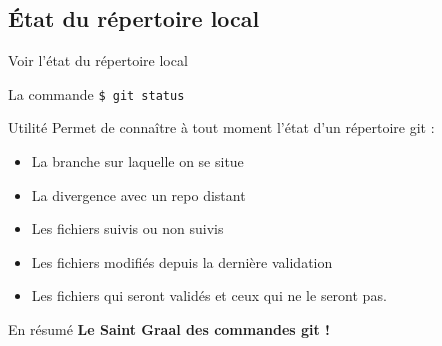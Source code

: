 \documentclass[usepdftitle=false]{beamer}
\begin{document}
\subsection{\'Etat du répertoire local}

\begin{frame}[fragile]{Voir l'état du répertoire local}
	\begin{block}{La commande}
		\verb+$ git status+
	\end{block}
	\begin{block}{Utilité}
		Permet de connaître à tout moment l'état d'un répertoire git :
		\begin{itemize}
			\item La branche sur laquelle on se situe
			\item La divergence avec un repo distant
			\item Les fichiers suivis ou non suivis
			\item Les fichiers modifiés depuis la dernière validation
			\item Les fichiers qui seront validés et ceux qui ne le seront pas.
		\end{itemize}
	\end{block}
	\begin{block}{En résumé}
		{\bf Le Saint Graal des commandes git !}
	\end{block}
\end{frame}
\end{document}
